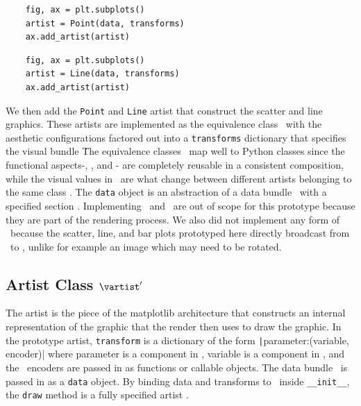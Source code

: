 \documentclass[../main.tex]{subfiles}
\begin{document}
\begin{multicols*}{2}
\begin{verbatim}
    fig, ax = plt.subplots()
    artist = Point(data, transforms)
    ax.add_artist(artist)
\end{verbatim}
\columnbreak
\begin{verbatim}
    fig, ax = plt.subplots()
    artist = Line(data, transforms)
    ax.add_artist(artist)
\end{verbatim}
\end{multicols*}

We then add the \texttt{Point} and \texttt{Line} artist that construct the scatter and line graphics. These artists are implemented as the equivalence class \vartisteq\ with the aesthetic configurations factored out into a \texttt{transforms} dictionary that specifies the visual bundle \vtotal\. The equivalence classes \vartisteq\ map well to Python classes since the functional aspects-\vchannel, \vmarkd, and \vindex - are completely reusable in a consistent composition, while the visual values in \vtotal\ are what change between different artists belonging to the same class \vartisteq. The \texttt{data} object is an abstraction of a data bundle \dtotal\ with a specified section \dsection. Implementing \gtotal\ and \gsection\ are out of scope for this prototype because they are part of the rendering process. We also did not implement any form of \vindex\ because the scatter, line, and bar plots prototyped here directly broadcast from \dbasepoint\ to \gbasepoint, unlike for example an image which may need to be rotated. 


\subsection{Artist Class $\vartist^{\prime}$}
\label{sec:code_artist}
The artist is the piece of the matplotlib architecture that constructs an internal representation of the graphic that the render then uses to draw the graphic. In the prototype artist, \texttt{transform} is a dictionary of the form \texttt|{parameter:(variable, encoder)}| where parameter is a component in \vfiber, variable is a component in \dfiber,  and the \vchannel\ encoders are passed in as functions or callable objects. The data bundle \dtotal\ is passed in as a \texttt{data} object. By binding data and transforms to \vartisteq\ inside \texttt{__init__}, the \texttt{draw} method is a fully specified artist \vartist.
\end{document}
